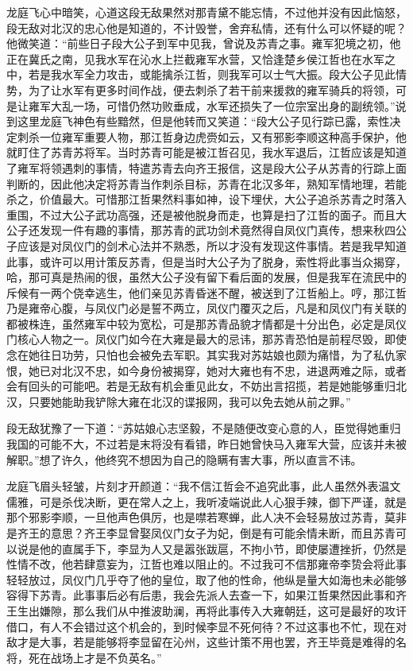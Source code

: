 龙庭飞心中暗笑，心道这段无敌果然对那青黛不能忘情，不过他并没有因此恼怒，段无敌对北汉的忠心他是知道的，不计毁誉，舍弃私情，还有什么可以怀疑的呢？他微笑道：“前些日子段大公子到军中见我，曾说及苏青之事。雍军犯境之初，他正在冀氏之南，见我水军在沁水上拦截雍军水营，又恰逢楚乡侯江哲也在水军之中，若是我水军全力攻击，或能擒杀江哲，则我军可以士气大振。段大公子见此情势，为了让水军有更多时间作战，便去刺杀了若干前来援救的雍军骑兵的将领，可是让雍军大乱一场，可惜仍然功败垂成，水军还损失了一位宗室出身的副统领。”说到这里龙庭飞神色有些黯然，但是他转而又笑道：“段大公子见行踪已露，索性决定刺杀一位雍军重要人物，那江哲身边虎赍如云，又有邪影李顺这种高手保护，他就盯住了苏青苏将军。当时苏青可能是被江哲召见，我水军退后，江哲应该是知道了雍军将领遇刺的事情，特遣苏青去向齐王报信，这是段大公子从苏青的行踪上面判断的，因此他决定将苏青当作刺杀目标，苏青在北汉多年，熟知军情地理，若能杀之，价值最大。可惜那江哲果然料事如神，设下埋伏，大公子追杀苏青之时落入重围，不过大公子武功高强，还是被他脱身而走，也算是扫了江哲的面子。而且大公子还发现一件有趣的事情，那苏青的武功剑术竟然得自凤仪门真传，想来秋四公子应该是对凤仪门的剑术心法并不熟悉，所以才没有发现这件事情。若是我早知道此事，或许可以用计策反苏青，但是当时大公子为了脱身，索性将此事当众揭穿，哈，那可真是热闹的很，虽然大公子没有留下看后面的发展，但是我军在流民中的斥候有一两个侥幸逃生，他们亲见苏青昏迷不醒，被送到了江哲船上。哼，那江哲乃是雍帝心腹，与凤仪门必是誓不两立，凤仪门覆灭之后，凡是和凤仪门有关联的都被株连，虽然雍军中较为宽松，可是那苏青品貌才情都是十分出色，必定是凤仪门核心人物之一。凤仪门如今在大雍是最大的忌讳，那苏青恐怕是前程尽毁，即使念在她往日功劳，只怕也会被免去军职。其实我对苏姑娘也颇为痛惜，为了私仇家恨，她已对北汉不忠，如今身份被揭穿，她对大雍也有不忠，进退两难之际，或者会有回头的可能吧。若是无敌有机会重见此女，不妨出言招揽，若是她能够重归北汉，只要她能助我铲除大雍在北汉的谍报网，我可以免去她从前之罪。”

段无敌犹豫了一下道：“苏姑娘心志坚毅，不是随便改变心意的人，臣觉得她重归我国的可能不大，不过若是末将没有看错，昨日她曾快马入雍军大营，应该并未被解职。”想了许久，他终究不想因为自己的隐瞒有害大事，所以直言不讳。

龙庭飞眉头轻皱，片刻才开颜道：“我不信江哲会不追究此事，此人虽然外表温文儒雅，可是杀伐决断，更在常人之上，我听凌端说此人心狠手辣，御下严谨，就是那个邪影李顺，一旦他声色俱厉，也是噤若寒蝉，此人决不会轻易放过苏青，莫非是齐王的意思？齐王李显曾娶凤仪门女子为妃，倒是有可能余情未断，而且苏青可以说是他的直属手下，李显为人又是嚣张跋扈，不拘小节，即使屡遭挫折，仍然是性情不改，他若肆意妄为，江哲也难以阻止的。不过我可不信那雍帝李贽会将此事轻轻放过，凤仪门几乎夺了他的皇位，取了他的性命，他纵是量大如海也未必能够容得下苏青。此事事后必有后患，我会先派人去查一下，如果江哲果然因此事和齐王生出嫌隙，那么我们从中推波助澜，再将此事传入大雍朝廷，这可是最好的攻讦借口，有人不会错过这个机会的，到时候李显不死何待？不过这事也不忙，现在对敌才是大事，若是能够将李显留在沁州，这些计策不用也罢，齐王毕竟是难得的名将，死在战场上才是不负英名。”

